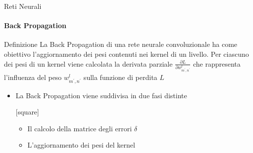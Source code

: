 \documentclass[
 ]{beamer}
\begin{document}

\begin{frame}{Reti Neurali}
    \framesubtitle{Back Propagation}
    
    \begin{block}{Definizione}
    La Back Propagation di una rete neurale convoluzionale ha come obiettivo l'aggiornamento dei pesi contenuti nei kernel di un livello. Per ciascuno dei pesi di un kernel viene calcolata la derivata parziale $\frac{\partial L}{\partial w_{m^{\prime}, n^{\prime}}^l}$ che rappresenta l'influenza del peso $w_{m^{\prime}, n^{\prime}}^l$ sulla funzione di perdita $L$
    \end{block}\pause
    
    \bigskip
    
     \begin{itemize} [<+->]
        \setlength\itemsep{2em}
        \item \large La Back Propagation viene suddivisa in due fasi distinte
        
        \bigskip
        
        [square] 
        \begin{itemize} [<+->] 
        \setlength\itemsep{1em}
            \item \large Il calcolo della matrice degli errori $\delta$
            \item \large L'aggiornamento dei pesi del kernel                     
        \end{itemize}
    \end{itemize}     
\end{frame}
\end{document}
